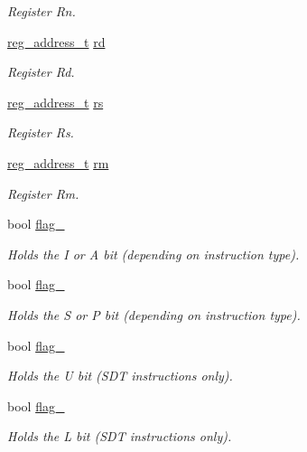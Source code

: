 \begin{DoxyCompactItemize}
\begin{DoxyCompactList}\small\item\em Register Rn. \end{DoxyCompactList}\item 
\hyperlink{global_8h_a462493a8f034b6ade38b69c49a39f52a}{reg\+\_\+address\+\_\+t} \hyperlink{structinstruction__t_a8ab8a544fae4f96f3ebf0b8b36ac3e1d}{rd}
\begin{DoxyCompactList}\small\item\em Register Rd. \end{DoxyCompactList}\item 
\hyperlink{global_8h_a462493a8f034b6ade38b69c49a39f52a}{reg\+\_\+address\+\_\+t} \hyperlink{structinstruction__t_a221c733fee7743d19a2468541eb3a6f2}{rs}
\begin{DoxyCompactList}\small\item\em Register Rs. \end{DoxyCompactList}\item 
\hyperlink{global_8h_a462493a8f034b6ade38b69c49a39f52a}{reg\+\_\+address\+\_\+t} \hyperlink{structinstruction__t_aeff2b2015b47eb6c511d57c058435fb3}{rm}
\begin{DoxyCompactList}\small\item\em Register Rm. \end{DoxyCompactList}\item 
bool \hyperlink{structinstruction__t_a2d1e7a105576c5bb98d45a51ef3d2e03}{flag\+\_}
\begin{DoxyCompactList}\small\item\em Holds the I or A bit (depending on instruction type). \end{DoxyCompactList}\item 
bool \hyperlink{structinstruction__t_a5e38a859429a96a7db9fbcbd452f1a70}{flag\+\_}
\begin{DoxyCompactList}\small\item\em Holds the S or P bit (depending on instruction type). \end{DoxyCompactList}\item 
bool \hyperlink{structinstruction__t_a185bd7654f18f654b666ccfe1d857659}{flag\+\_}
\begin{DoxyCompactList}\small\item\em Holds the U bit (S\+DT instructions only). \end{DoxyCompactList}\item 
bool \hyperlink{structinstruction__t_a004b3ac9779d188ae99bc0c7180dab8d}{flag\+\_}
\begin{DoxyCompactList}\small\item\em Holds the L bit (S\+DT instructions only). \end{DoxyCompactList}\item 

\end{DoxyCompactItemize}
